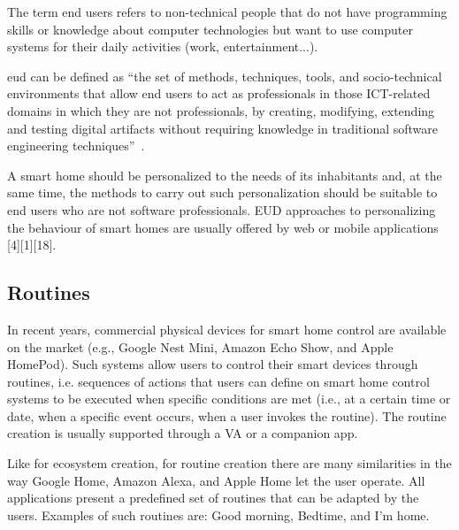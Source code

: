 The term end users refers to non-technical people that do not have programming skills or knowledge about computer technologies but want to use computer systems for their daily activities (work, entertainment...).

\acrfull{eud} can be defined as “the set of methods, techniques, tools, and socio-technical environments that allow end users to act as professionals in those ICT-related domains in which they are not professionals, by creating, modifying, extending and testing digital artifacts without requiring knowledge in traditional software engineering techniques”~\parencite{barricelliEnduserDevelopmentEnduser2019}.

A smart home should be personalized to the needs of its inhabitants and, at the same time, the methods to carry out such personalization should be suitable to end users who are not software professionals. EUD approaches to personalizing the behaviour of smart homes are usually offered by web or mobile applications [4][1][18].

\subsection{Routines}

In recent years, commercial physical devices for smart home control are available on the market (e.g., Google Nest Mini, Amazon Echo Show, and Apple HomePod). Such systems allow users to control their smart devices through routines, i.e. sequences of actions that users can define on smart home control systems to be executed when specific conditions are met (i.e., at a certain time or date, when a specific event occurs, when a user invokes the routine). The routine creation is usually supported through a VA or a companion app.

Like for ecosystem creation, for routine creation there are many similarities in the way Google Home, Amazon Alexa, and Apple Home let the user operate. All applications present a predefined set of routines that can be adapted by the users. Examples of such routines are: Good morning, Bedtime, and I'm home.

